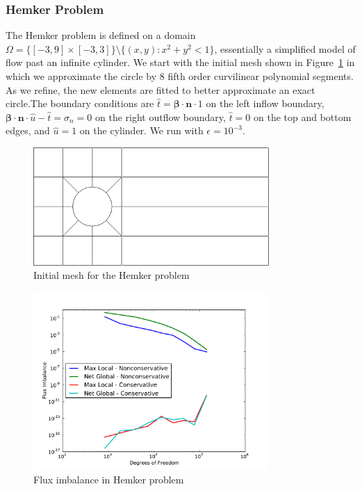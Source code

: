 \documentclass[letterpaper]{article}
\def\bbeta{\boldsymbol\beta}
\begin{document}
\subsubsection{Hemker Problem}
The Hemker problem is defined on a domain
$\Omega=\{[-3,9]\times[-3,3]\}\setminus\{(x,y):x^2+y^2<1\}$, essentially a simplified
model of flow past an infinite cylinder. We start with the initial mesh shown
in Figure~\ref{fig:hemkerInitial} in which we approximate the circle by 8
fifth order curvilinear polynomial segments. As we refine, the new elements are
fitted to better approximate an exact circle.The boundary conditions are $\hat
t=\bbeta\cdot\mathbf{n}\cdot 1$ on the left inflow boundary,
$\bbeta\cdot\mathbf{n}\cdot\hat u-\hat t=\sigma_n=0$ on the right outflow
boundary, $\hat t=0$ on the top and bottom edges, and $\hat u=1$ on the
cylinder. We run with $\epsilon=10^{-3}$.

\begin{figure}[p]
\centering
\includegraphics[width=0.8\textwidth]{figs/Hemker/initial_mesh.png}
\caption{Initial mesh for the Hemker problem}
\label{fig:hemkerInitial}
\end{figure}

\begin{figure}[p]
\centering
\centering
\includegraphics[width=0.8\textwidth]{figs/Hemker/modifiedFlux.pdf}
\caption{Flux imbalance in Hemker problem}
\label{fig:hemkerFlux}
\end{figure}
\end{document}
